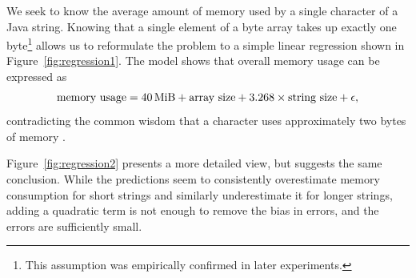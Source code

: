 \documentclass{article}
\begin{document}
We seek to know the average amount of memory used by a single character of a
Java string. Knowing that a single element of a byte array takes up exactly one
byte\footnote{This assumption was empirically confirmed in later experiments.}
allows us to reformulate the problem to a simple linear regression shown in
Figure~\ref{fig:regression1}. The model shows that overall memory usage can be
expressed as
\begin{equation} \label{eq:regression}
  \text{memory usage} = \SI{40}{\mebi\byte} + \text{array size} + 3.268 \times
  \text{string size} + \epsilon,
\end{equation}
contradicting the common wisdom that a character uses approximately two bytes of
memory \cite{java_memory}.

Figure~\ref{fig:regression2} presents a more detailed view, but suggests
the same conclusion. While the predictions seem to consistently overestimate
memory consumption for short strings and similarly underestimate it for longer
strings, adding a quadratic term is not enough to remove the bias in errors, and
the errors are sufficiently small.
\end{document}
